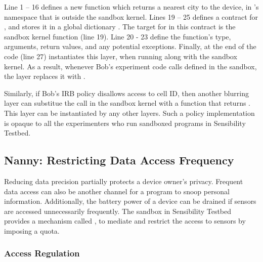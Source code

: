 Line 1 -- 16 defines a new function  which returns a nearest city to the
device, in 's namespace that is outside the sandbox kernel. 
Lines 19 -- 25 defines a contract for , and stores it in a global dictionary 
. The target for  in this
contract is the sandbox kernel function  (line 19).
Line 20 - 23 define the function's type, arguments,
return values, and any potential exceptions. 
Finally,  at the end of the code (line 27) instantiates this
 layer, when running along with the sandbox kernel. As a result, 
whenever Bob's experiment code calls  defined in the sandbox, 
the  layer replaces it with . 

Similarly, if Bob's IRB policy disallows access to cell ID, then another blurring layer 
can substitue the  call in the sandbox kernel with a function that
returns . This layer can be instantiated by any other layers.
Such a policy implementation is opaque to all the experimenters who run 
sandboxed programs in Sensibility Testbed.

\subsection{Nanny: Restricting Data Access Frequency}

Reducing data precision partially protects a device owner's privacy. Frequent data 
access can also be another channel for a program to snoop personal information.
Additionally, the battery power of a device can be drained if sensors are accessed
unnecessarily frequently. The sandbox in Sensibility Testbed provides a mechanism
called , to mediate and restrict the access to sensors by imposing a quota. 

\subsubsection{Access Regulation}

